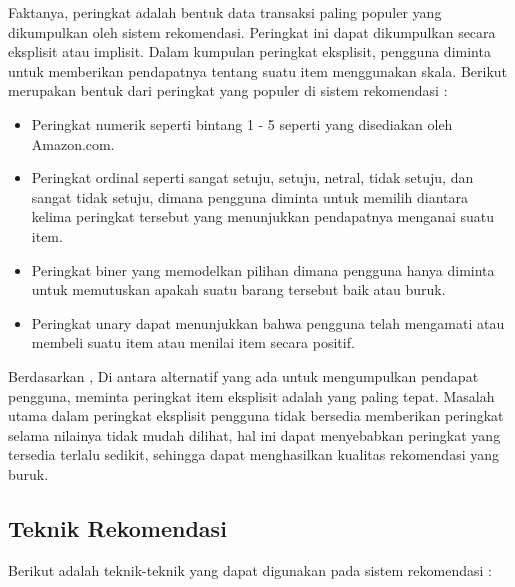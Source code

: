 \begin{enumerate}
		Faktanya, peringkat adalah bentuk data transaksi paling populer yang dikumpulkan oleh sistem rekomendasi. Peringkat ini dapat dikumpulkan secara eksplisit atau implisit. Dalam kumpulan peringkat eksplisit, pengguna diminta untuk memberikan pendapatnya tentang suatu item menggunakan skala. Berikut merupakan bentuk dari peringkat yang populer di sistem rekomendasi :
		
		\begin{itemize}
			\item Peringkat numerik seperti bintang 1 - 5 seperti yang disediakan oleh Amazon.com.
		
			\item Peringkat ordinal seperti sangat setuju, setuju, netral, tidak setuju, dan sangat tidak setuju, dimana pengguna diminta untuk memilih diantara kelima peringkat tersebut yang menunjukkan pendapatnya menganai suatu item.
		
			\item Peringkat biner yang memodelkan pilihan dimana pengguna hanya diminta untuk memutuskan apakah suatu barang tersebut baik atau buruk.
		
			\item Peringkat unary dapat menunjukkan bahwa pengguna telah mengamati atau membeli suatu item atau menilai item secara positif.
		\end{itemize}
		
		Berdasarkan \cite{buku:sistem:rekomendasi:2}, Di antara alternatif yang ada untuk mengumpulkan pendapat pengguna, meminta peringkat item eksplisit adalah yang paling tepat. Masalah utama dalam peringkat eksplisit pengguna tidak bersedia memberikan peringkat selama nilainya tidak mudah dilihat, hal ini dapat menyebabkan peringkat yang tersedia terlalu sedikit, sehingga dapat menghasilkan kualitas rekomendasi yang buruk.
		
	\end{enumerate}
	
\subsection{Teknik Rekomendasi}
\label{teknik rekomendasi}
Berikut adalah teknik-teknik yang dapat digunakan pada sistem rekomendasi \cite{buku:sistem:rekomendasi}: %

